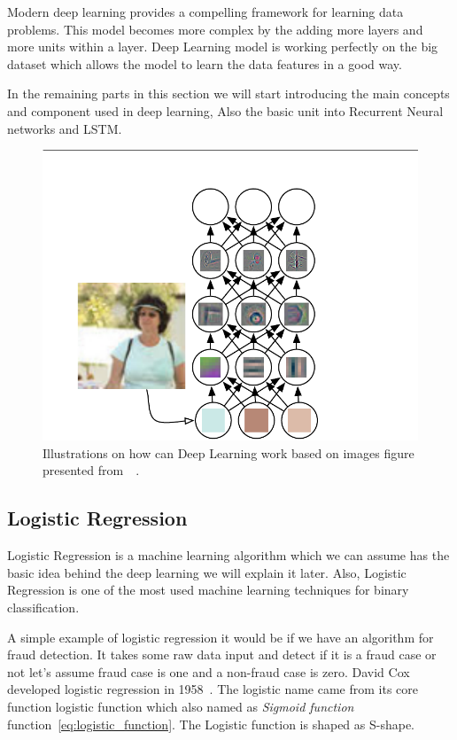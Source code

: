       
Modern deep learning provides a compelling framework for learning data problems. This model becomes more complex by the adding more layers and more units within a layer. Deep Learning model is working perfectly on the big dataset which allows the model to learn the data features in a good way.


In the remaining parts in this section we will start introducing the main concepts and component used in deep learning, Also the basic unit into Recurrent Neural networks and LSTM.

      
\begin{figure}[ht!] \includegraphics[width=\linewidth]{./Figures/Ch_2_Background/DeepLearningImagePersonExample.png}
  \caption{Illustrations on how can Deep Learning work based on images figure presented from~\cite{Goodfellow-et-al-2016}~\cite{Zeiler2014}.}
  \label{fig:DeepLearningImagePersonExample.png}
\end{figure}


\newpage
\subsection{Logistic Regression}
Logistic Regression is a machine learning algorithm which we can assume has the basic idea behind the deep learning we will explain it later. Also, Logistic Regression is one of the most used machine learning techniques for binary classification.

A simple example of logistic regression it would be if we have an algorithm for fraud detection. It takes some raw data input and detect if it is a fraud case or not let’s assume fraud case is one and a non-fraud case is zero. David Cox developed logistic regression in 1958~\cite{Cox2958}. The logistic name came from its core function logistic function which also named as \textit{Sigmoid function}  function~\eqref{eq:logistic_function}. The Logistic function is shaped as S-shape.

